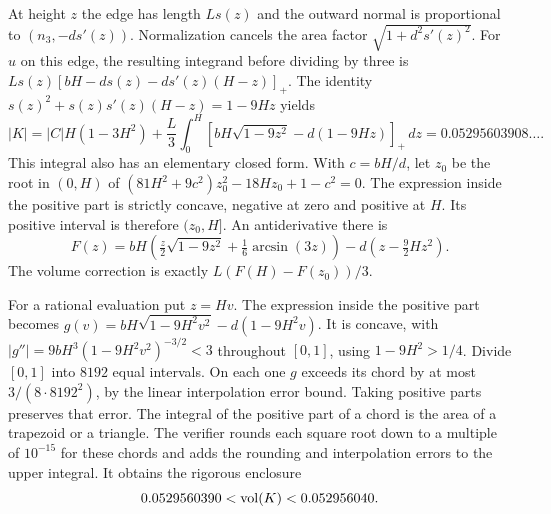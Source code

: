 At height $z$ the edge has length $L s(z)$ and the outward normal is
proportional to $(n_3,-d s'(z))$. Normalization cancels the area
factor $\sqrt{1+d^2s'(z)^2}$. For $u$ on this edge,
the resulting integrand before dividing by three is
$L s(z)[bH-ds(z)-ds'(z)(H-z)]_+$.
The identity $s(z)^2+s(z)s'(z)(H-z)=1-9Hz$ yields
\[
 |K|=|C| H(1-3H^2)
  +\frac L3\int_0^H
  \left[bH\sqrt{1-9z^2}-d(1-9Hz)\right]_+\,dz
  =0.05295603908\ldots .
\]
This integral also has an elementary closed form. With $c=bH/d$, let $z_0$ be the root in $(0,H)$ of
$(81H^2+9c^2)z_0^2-18Hz_0+1-c^2=0$. The expression inside the positive part is strictly concave, negative at zero and positive at $H$. Its positive interval is therefore $(z_0,H]$. An antiderivative there is
\[
 F(z)=bH\left(\tfrac z2\sqrt{1-9z^2}+\tfrac16\arcsin(3z)\right)-d\left(z-\tfrac92 Hz^2\right).
\]
The volume correction is exactly $L(F(H)-F(z_0))/3$.

For a rational evaluation put $z=Hv$. The expression inside the positive part becomes
$g(v)=bH\sqrt{1-9H^2v^2}-d(1-9H^2v)$.
It is concave, with $|g''|=9bH^3(1-9H^2v^2)^{-3/2}<3$ throughout $[0,1]$, using $1-9H^2>1/4$. Divide $[0,1]$ into $8192$ equal intervals. On each one $g$ exceeds its chord by at most $3/(8\cdot8192^2)$, by the linear interpolation error bound. Taking positive parts preserves that error. The integral of the positive part of a chord is the area of a trapezoid or a triangle. The verifier rounds each square root down to a multiple of $10^{-15}$ for these chords and adds the rounding and interpolation errors to the upper integral. It obtains the rigorous enclosure
\[
        0.0529560390 < \operatorname{vol}(K) < 0.052956040 .
\]
